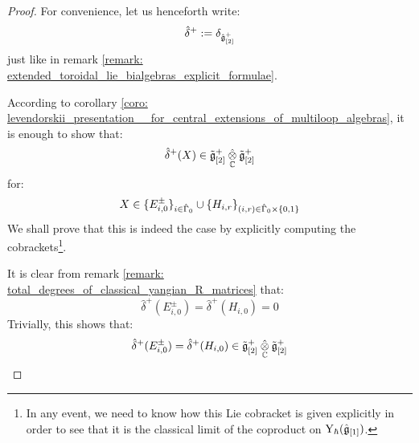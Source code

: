                 \begin{proof}
                    For convenience, let us henceforth write:
                        $$\hat{\delta}^+ := \delta_{\hat{\mathfrak{g}}_{[2]}^+}$$
                    just like in remark \ref{remark: extended_toroidal_lie_bialgebras_explicit_formulae}.
                
                    According to corollary \ref{coro: levendorskii_presentation__for_central_extensions_of_multiloop_algebras}, it is enough to show that:
                        $$\hat{\delta}^+(X) \in \tilde{\g}_{[2]}^+ \hattensor_{\bbC} \tilde{\g}_{[2]}^+$$
                    for:
                        $$X \in \{E_{i, 0}^{\pm}\}_{i \in \hat{\Gamma}_0} \cup \{H_{i, r}\}_{(i, r) \in \hat{\Gamma}_0 \x \{0, 1\}}$$
                    We shall prove that this is indeed the case by explicitly computing the cobrackets\footnote{In any event, we need to know how this Lie cobracket is given explicitly in order to see that it is the classical limit of the coproduct on $\mathrm{Y}_{\hbar}(\hat{\mathfrak{g}}_{[1]})$.}.
                    
                    It is clear from remark \ref{remark: total_degrees_of_classical_yangian_R_matrices} that:
                        $$\hat{\delta}^+(E_{i, 0}^{\pm}) = \hat{\delta}^+(H_{i, 0}) = 0$$
                    Trivially, this shows that:
                        $$\hat{\delta}^+(E_{i, 0}^{\pm}) = \hat{\delta}^+(H_{i, 0}) \in \tilde{\g}_{[2]}^+ \hattensor_{\bbC} \tilde{\g}_{[2]}^+$$
                

\end{proof}
